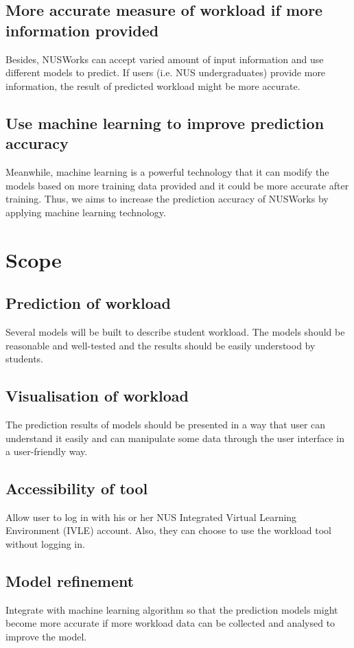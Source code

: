 \documentclass[fyp]{socreport}
\begin{document}
\subsection{More accurate measure of workload if more information provided}
Besides, NUSWorks can accept varied amount of input information and use different models to predict. If users (i.e. NUS undergraduates) provide more information, the result of predicted workload might be more accurate.

\subsection{Use machine learning to improve prediction accuracy}
Meanwhile, machine learning is a powerful technology that it can modify the models based on more training data provided and it could be more accurate after training. Thus, we aims to increase the prediction accuracy of NUSWorks by applying machine learning technology.

\section{Scope}
\subsection{Prediction of workload}
Several models will be built to describe student workload. The models should be reasonable and well-tested and the results should be easily understood by students.

\subsection{Visualisation of workload}
The prediction results of models should be presented in a way that user can understand it easily and can manipulate some data through the user interface in a user-friendly way.

\subsection{Accessibility of tool}
Allow user to log in with his or her NUS Integrated Virtual Learning Environment (IVLE) account. Also, they can choose to use the workload tool without logging in.

\subsection{Model refinement}
Integrate with machine learning algorithm so that the prediction models might become more accurate if more workload data can be collected and analysed to improve the model.
\end{document}
